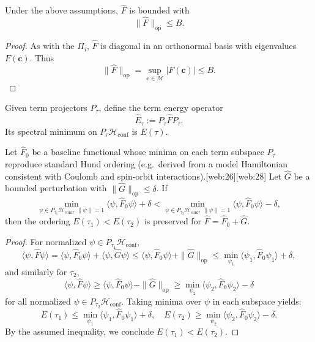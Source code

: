 \documentclass[11pt]{article}
\begin{document}
\begin{lemma}
Under the above assumptions, \(\widehat{F}\) is bounded with
\[
\|\widehat{F}\|_{\text{op}} \le B.
\]
\end{lemma}

\begin{proof}
As with the \(\Pi_i\), \(\widehat{F}\) is diagonal in an orthonormal basis with eigenvalues \(F(\mathbf{c})\). Thus
\[
\|\widehat{F}\|_{\text{op}} = \sup_{\mathbf{c}\in\mathcal{M}} |F(\mathbf{c})| \le B.
\]
\end{proof}

Given term projectors \(P_\tau\), define the term energy operator
\[
\widehat{E}_\tau := P_\tau \widehat{F} P_\tau.
\]
Its spectral minimum on \(P_\tau \mathcal{H}_{\text{conf}}\) is \(E(\tau)\).

\begin{lemma}
Let \(\widehat{F}_0\) be a baseline functional whose minima on each term subspace \(P_\tau\) reproduce standard Hund ordering (e.g.\ derived from a model Hamiltonian consistent with Coulomb and spin-orbit interactions).[web:26][web:28] Let \(\widehat{G}\) be a bounded perturbation with \(\|\widehat{G}\|_{\text{op}} \le \delta\). If
\[
\min_{\psi\in P_{\tau_1}\mathcal{H}_{\text{conf}},\,\|\psi\|=1} \langle \psi, \widehat{F}_0 \psi \rangle
+
\delta
<
\min_{\psi\in P_{\tau_2}\mathcal{H}_{\text{conf}},\,\|\psi\|=1} \langle \psi, \widehat{F}_0 \psi \rangle
-
\delta,
\]
then the ordering \(E(\tau_1) < E(\tau_2)\) is preserved for \(\widehat{F} = \widehat{F}_0 + \widehat{G}\).
\end{lemma}

\begin{proof}
For normalized \(\psi\in P_{\tau_1}\mathcal{H}_{\text{conf}}\),
\[
\langle \psi, \widehat{F} \psi \rangle
= \langle \psi, \widehat{F}_0 \psi \rangle + \langle \psi, \widehat{G} \psi \rangle
\le \langle \psi, \widehat{F}_0 \psi \rangle + \|\widehat{G}\|_{\text{op}}
\le \min_{\psi_1} \langle \psi_1, \widehat{F}_0 \psi_1 \rangle + \delta,
\]
and similarly for \(\tau_2\),
\[
\langle \psi, \widehat{F} \psi \rangle
\ge \langle \psi, \widehat{F}_0 \psi \rangle - \|\widehat{G}\|_{\text{op}}
\ge \min_{\psi_2} \langle \psi_2, \widehat{F}_0 \psi_2 \rangle - \delta
\]
for all normalized \(\psi\in P_{\tau_2}\mathcal{H}_{\text{conf}}\). Taking minima over \(\psi\) in each subspace yields:
\[
E(\tau_1) \le \min_{\psi_1} \langle \psi_1, \widehat{F}_0 \psi_1 \rangle + \delta,\quad
E(\tau_2) \ge \min_{\psi_2} \langle \psi_2, \widehat{F}_0 \psi_2 \rangle - \delta.
\]
By the assumed inequality, we conclude \(E(\tau_1) < E(\tau_2)\).
\end{proof}
\end{document}
